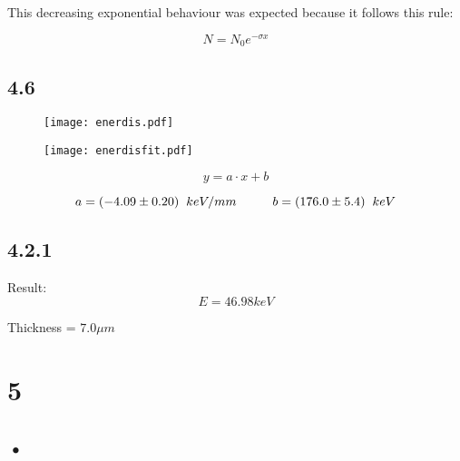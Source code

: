 \documentclass[a4paper,12pt]{article}
\begin{document}
This decreasing exponential behaviour was expected because it follows this rule: 

$$N = N_0 e^{- \sigma x}$$

\subsection{4.6}

\begin{figure}[H]
\centering
\label{fig:withouta}
\texttt{[image: enerdis.pdf]}
\end{figure}

\begin{figure}[H]
\centering
\label{fig:withouta}
\texttt{[image: enerdisfit.pdf]}
\end{figure}

$$y = a \cdot x + b $$

$$a = (-4.09 \pm 0.20) \hspace{0.2cm} keV/mm \hspace{1cm} b = (176.0 \pm 5.4) \hspace{0.2cm} keV$$

\subsection{4.2.1}

Result: $$E = 46.98 keV$$

Thickness = $7.0 \mu m$

\section{5}

\subsection{•}
\end{document}
